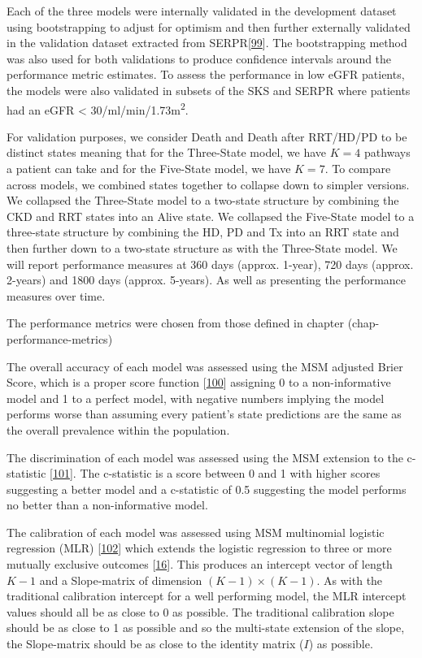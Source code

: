 \documentclass[12pt,PhD,twoside,openright]{muthesis}
\begin{document}
Each of the three models were internally validated in the development dataset using bootstrapping to adjust for optimism and then further externally validated in the validation dataset extracted from SERPR{[}\protect\hyperlink{ref-schomaker_bootstrap_2018}{99}{]}. The bootstrapping method was also used for both validations to produce confidence intervals around the performance metric estimates. To assess the performance in low eGFR patients, the models were also validated in subsets of the SKS and SERPR where patients had an eGFR \textless{} 30/ml/min/1.73m\textsuperscript{2}.

For validation purposes, we consider Death and Death after RRT/HD/PD to be distinct states meaning that for the Three-State model, we have \(K=4\) pathways a patient can take and for the Five-State model, we have \(K=7\). To compare across models, we combined states together to collapse down to simpler versions. We collapsed the Three-State model to a two-state structure by combining the CKD and RRT states into an Alive state. We collapsed the Five-State model to a three-state structure by combining the HD, PD and Tx into an RRT state and then further down to a two-state structure as with the Three-State model. We will report performance measures at 360 days (approx. 1-year), 720 days (approx. 2-years) and 1800 days (approx. 5-years). As well as presenting the performance measures over time.

The performance metrics were chosen from those defined in chapter (chap-performance-metrics)

The overall accuracy of each model was assessed using the MSM adjusted Brier Score, which is a proper score function {[}\protect\hyperlink{ref-gneiting_strictly_2007}{100}{]} assigning 0 to a non-informative model and 1 to a perfect model, with negative numbers implying the model performs worse than assuming every patient's state predictions are the same as the overall prevalence within the population.

The discrimination of each model was assessed using the MSM extension to the c-statistic {[}\protect\hyperlink{ref-calster_extending_2012-1}{101}{]}. The c-statistic is a score between 0 and 1 with higher scores suggesting a better model and a c-statistic of 0.5 suggesting the model performs no better than a non-informative model.

The calibration of each model was assessed using MSM multinomial logistic regression (MLR) {[}\protect\hyperlink{ref-hoorde_assessing_2014}{102}{]} which extends the logistic regression to three or more mutually exclusive outcomes {[}\protect\hyperlink{ref-riley_prognosis_2019}{16}{]}. This produces an intercept vector of length \(K-1\) and a Slope-matrix of dimension \((K-1) \times (K-1)\). As with the traditional calibration intercept for a well performing model, the MLR intercept values should all be as close to 0 as possible. The traditional calibration slope should be as close to 1 as possible and so the multi-state extension of the slope, the Slope-matrix should be as close to the identity matrix (\(I\)) as possible.
\end{document}
